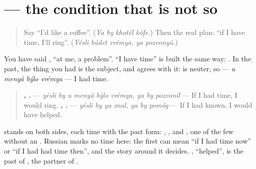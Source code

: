 \section[\texorpdfstring{\ru{если} \ru{бы} \ru{у} \ru{меня} … (yésli by u menyá …)}{если бы у меня … (yésli by u menyá …)}]{  — the condition that is not so}

\label{lesson:RU-C270-yesli-by}



\begin{quote}
Say \textquotedblleft{}I'd like a coffee\textquotedblright{}. (\emph{Ya by khotél kófe.}) Then the real plan: \textquotedblleft{}if I have time, I'll ring\textquotedblright{}. (\emph{Yésli búdet vrémya, ya pozvonyú.})
\end{quote}

\begin{grammarlens}[title={Grammar Lens: \ru{у} \ru{меня} \ru{было}, I had}]
You have said \textbf{  }, \textquotedblleft{}at me, a problem\textquotedblright{}. \textquotedblleft{}I have time\textquotedblright{} is built the same way: \textbf{   }. In the past, the thing you had is the subject, and \textbf{} agrees with it: \emph{} is neuter, so \textbf{   } — \emph{u menyá býlo vrémya} — I had time.
\end{grammarlens}

\begin{grammarlens}[title={Grammar Lens: \ru{бы} on both sides}]
\begin{quote}
\textbf{     ,   .} — \emph{yésli by u menyá býlo vrémya, ya by pozvoníl} — If I had time, I would ring. \textbf{   ,   .} — \emph{yésli by ya znal, ya by pomóg} — If I had known, I would have helped.
\end{quote}

\textbf{} stands on both sides, each time with the past form: \emph{}, \emph{}, and \emph{}, one of the few without an \emph{}. Russian marks no time here: the first can mean \textquotedblleft{}if I had time now\textquotedblright{} or \textquotedblleft{}if I had had time then\textquotedblright{}, and the story around it decides. \textbf{}, \textquotedblleft{}helped\textquotedblright{}, is the past of \emph{}, the partner of \emph{}.
\end{grammarlens}

